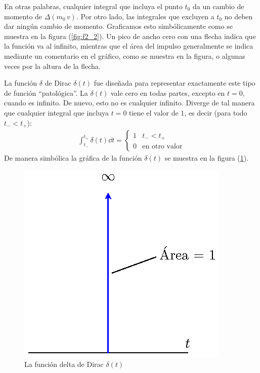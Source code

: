 En otras palabras, cualquier integral que incluya el punto $t_{0}$ da un cambio de momento de $\Delta (m_{0} \, v)$. Por otro lado, las integrales que excluyen a $t_{0}$ no deben dar ningún cambio de momento. Graficamos esto simbólicamente como se muestra en la figura (\ref{fig:f2_2}). Un pico de ancho cero con una flecha indica que la función va al infinito, mientras que el área del impulso generalmente se indica mediante un comentario en el gráfico, como se muestra en la figura, o algunas veces por la altura de la flecha.
\par
La función $\delta$ de Dirac $\delta (t)$ fue diseñada para representar exactamente este tipo de función \enquote{patológica}. La $\delta (t)$ vale cero en todas partes, excepto en $t = 0$, cuando es infinito. De nuevo, esto no es cualquier infinito. Diverge de tal manera que cualquier integral que incluya $t = 0$ tiene el valor de $1$, es decir (para todo $t_{-} < t_{+}$):
\begin{align}
\int_{t_{-}}^{t_{+}} \delta (t) \dd{t} = \begin{cases}
1 & t_{-} < t_{+} \\
0 & \mbox{en otro valor}
\end{cases}
\label{eq:ecuacion_05_03}
\end{align}
\noindent
De manera simbólica la gráfica de la función $\delta (t)$ se muestra en la figura (\ref{fig:figura_05_03}). 
\begin{figure}[H]
    \centering
    \includegraphics[scale=1.3]{Imagenes/delta_Dirac_Momento_05.eps}
    \caption{La función delta de Dirac $\delta (t)$}
    \label{fig:figura_05_03}
\end{figure}

